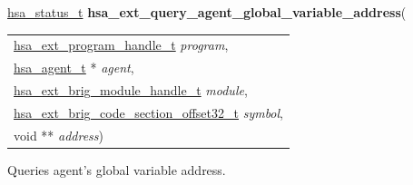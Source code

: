 \documentclass[final]{book}
\newcommand{\hsaarg}[1]{\textit{#1}}
\begin{document}
\noindent\begin{tcolorbox}[breakable,nobeforeafter,colframe=white,colback=lightgray,left=0mm]
\hyperlink{group__status_1gad755322e7ff95456520e8abdbe90d225}{hsa_status_t} \hypertarget{group__HsailLinkerServiceLayer_1ga0d925deb82887547f72aa4eec6dfc222}{\textbf{hsa_ext_query_agent_global_variable_address}}(
\vspace{-3.5mm}\begin{longtable}{@{}p{\textwidth}}
\hspace{1.7em}\hyperlink{group__HsailLinkerServiceLayer_1gaea8d90863414407ddba7e318db7412f9}{hsa_ext_program_handle_t} \hsaarg{program},\\
\hspace{1.7em}\hyperlink{group__topology_1gab8db3fb886332a24acac08ec361e1d86}{hsa_agent_t} * \hsaarg{agent},\\
\hspace{1.7em}\hyperlink{group__FinalizerCoreApi_1ga0216996f5341a8591ecf9e0f6fd1b7e5}{hsa_ext_brig_module_handle_t} \hsaarg{module},\\
\hspace{1.7em}\hyperlink{group__FinalizerCoreApi_1ga494b8ac14a8c10af95b83b51a8a4ad7f}{hsa_ext_brig_code_section_offset32_t} \hsaarg{symbol},\\
\hspace{1.7em}void ** \hsaarg{address})\end{longtable}

\end{tcolorbox}
Queries agent's global variable address.
\end{document}
